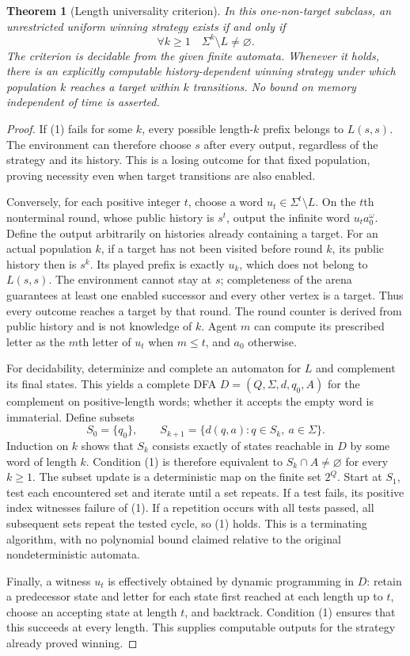 \documentclass[11pt]{article}
\newtheorem{theorem}{Theorem}
\theoremstyle{definition}
\theoremstyle{remark}
\begin{document}
\begin{theorem}[Length universality criterion]\label{thm:onevertex}
In this one-non-target subclass, an unrestricted uniform winning strategy
exists if and only if
\[
 \forall k\geq1\quad \Sigma^k\setminus L\neq\varnothing.       \tag{1}
\]
The criterion is decidable from the given finite automata. Whenever it holds,
there is an explicitly computable history-dependent winning strategy under
which population $k$ reaches a target within $k$ transitions. No bound on
memory independent of time is asserted.
\end{theorem}
\begin{proof}
If (1) fails for some $k$, every possible length-$k$ prefix belongs to
$L(s,s)$. The environment can therefore choose $s$ after every output,
regardless of the strategy and its history. This is a losing outcome for
that fixed population, proving necessity even when target transitions are
also enabled.

Conversely, for each positive integer $t$, choose a word
$u_t\in\Sigma^t\setminus L$. On the $t$th nonterminal round, whose public
history is $s^t$, output the infinite word $u_t a_0^\omega$.
Define the output arbitrarily on histories already containing a target.
For an actual population $k$, if a target has not been visited before round
$k$, its public history then is $s^k$. Its played prefix is exactly $u_k$,
which does not belong to $L(s,s)$. The environment cannot stay at $s$;
completeness of the arena guarantees at least one enabled successor and
every other vertex is a target. Thus every outcome reaches a target by that
round. The round counter is derived from public history and is not knowledge
of $k$. Agent $m$ can compute its prescribed letter as the $m$th letter of
$u_t$ when $m\leq t$, and $a_0$ otherwise.

For decidability, determinize and complete an automaton for $L$ and complement
its final states. This yields a complete DFA
$D=(Q,\Sigma,d,q_0,A)$ for the complement on positive-length words; whether
it accepts the empty word is immaterial. Define subsets
\[
 S_0=\{q_0\},\qquad
 S_{k+1}=\{d(q,a):q\in S_k,\ a\in\Sigma\}.
\]
Induction on $k$ shows that $S_k$ consists exactly of states reachable in $D$
by some word of length $k$. Condition (1) is therefore equivalent to
$S_k\cap A\neq\varnothing$ for every $k\geq1$.
The subset update is a deterministic map on the finite set $2^Q$.
Start at $S_1$, test each encountered set and iterate until a set repeats.
If a test fails, its positive index witnesses failure of (1). If a repetition
occurs with all tests passed, all subsequent sets repeat the tested cycle,
so (1) holds. This is a terminating algorithm, with no polynomial bound
claimed relative to the original nondeterministic automata.

Finally, a witness $u_t$ is effectively obtained by dynamic programming in
$D$: retain a predecessor state and letter for each state first reached at
each length up to $t$, choose an accepting state at length $t$, and backtrack.
Condition (1) ensures that this succeeds at every length. This supplies
computable outputs for the strategy already proved winning.
\end{proof}
\end{document}
